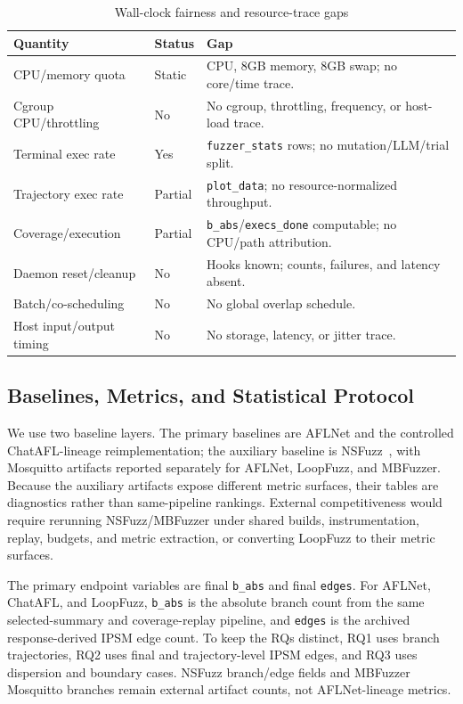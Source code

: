 \documentclass[final,5p,times,number]{elsarticle}
\begin{document}
\begin{table}[!t]
\centering
\caption{Wall-clock fairness and resource-trace gaps}
\label{tab:wallclock_resource_status}
{\scriptsize
\setlength{\tabcolsep}{3.6pt}
\renewcommand{\arraystretch}{1.05}
\begin{tabularx}{0.88\textwidth}{>{\raggedright\arraybackslash}p{}
>{\centering\arraybackslash}p{}
>{\raggedright\arraybackslash}X}
\toprule
Quantity & Status & Gap \\
\midrule
CPU/memory quota & Static & 1 CPU, 8GB memory, 8GB swap; no core/time trace. \\
Cgroup CPU/throttling & No & No cgroup, throttling, frequency, or host-load trace. \\
Terminal exec rate & Yes & \texttt{fuzzer\_stats} rows; no mutation/LLM/trial split. \\
Trajectory exec rate & Partial & \texttt{plot\_data}; no resource-normalized throughput. \\
Coverage/execution & Partial & \texttt{b\_abs}/\texttt{execs\_done} computable; no CPU/path attribution. \\
Daemon reset/cleanup & No & Hooks known; counts, failures, and latency absent. \\
Batch/co-scheduling & No & No global overlap schedule. \\
Host input/output timing & No & No storage, latency, or jitter trace. \\
\bottomrule
\end{tabularx}
}
\end{table}

\subsection{Baselines, Metrics, and Statistical Protocol}
We use two baseline layers. The primary baselines are AFLNet and the controlled ChatAFL-lineage reimplementation; the auxiliary baseline is NSFuzz~\cite{nsfuzz}, with Mosquitto artifacts reported separately for AFLNet, LoopFuzz, and MBFuzzer. Because the auxiliary artifacts expose different metric surfaces, their tables are diagnostics rather than same-pipeline rankings. External competitiveness would require rerunning NSFuzz/MBFuzzer under shared builds, instrumentation, replay, budgets, and metric extraction, or converting LoopFuzz to their metric surfaces.

The primary endpoint variables are final \texttt{b\_abs} and final \texttt{edges}. For AFLNet, ChatAFL, and LoopFuzz, \texttt{b\_abs} is the absolute branch count from the same selected-summary and coverage-replay pipeline, and \texttt{edges} is the archived response-derived IPSM edge count. To keep the RQs distinct, RQ1 uses branch trajectories, RQ2 uses final and trajectory-level IPSM edges, and RQ3 uses dispersion and boundary cases. NSFuzz branch/edge fields and MBFuzzer Mosquitto branches remain external artifact counts, not AFLNet-lineage metrics.
\end{document}
